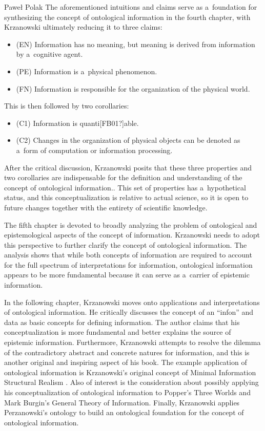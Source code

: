 \begin{newrevengenv}{Paweł Polak}
The aforementioned intuitions and claims serve as a~foundation for synthesizing the concept of ontological information in the fourth chapter, with Krzanowski ultimately reducing it to three claims:

\begin{itemize}
\item (EN) Information has no meaning, but meaning is derived from information by a~cognitive agent.
\item (PE) Information is a~physical phenomenon.
\item (FN) Information is responsible for the organization of the physical world.
\end{itemize}
This is then followed by two corollaries:

\begin{itemize}
\item (C1) Information is quanti[FB01?]able.
\item (C2) Changes in the organization of physical objects can be denoted as a~form of computation or information processing.
\end{itemize}
After the critical discussion, Krzanowski posits that these three properties and two corollaries are indispensable for the definition and understanding of the concept of ontological information.. This set of properties has a~hypothetical status, and this conceptualization is relative to actual science, so it is open to future changes together with the entirety of scientific knowledge.

The fifth chapter is devoted to broadly analyzing the problem of ontological and epistemological aspects of the concept of information. Krzanowski needs to adopt this perspective to further clarify the concept of ontological information. The analysis shows that while both concepts of information are required to account for the full spectrum of interpretations for information, ontological information appears to be more fundamental because it can serve as a~carrier of epistemic information.

In the following chapter, Krzanowski moves onto applications and interpretations of ontological information. He critically discusses the concept of an ``infon'' and data as basic concepts for defining information. The author claims that his conceptualization is more fundamental and better explains the source of epistemic information. Furthermore, Krzanowski attempts to resolve the dilemma of the contradictory abstract and concrete natures for information, and this is another original and inspiring aspect of his book. The example application of ontological information is Krzanowski's original concept of Minimal Information Structural Realism
\parencite[first introduced in][]{krzanowski_minimal_2017}. %
 Also of interest is the consideration about possibly applying his conceptualization of ontological information to Popper's Three Worlds and Mark Burgin's General Theory of Information. Finally, Krzanowski applies Perzanowski's ontology to build an ontological foundation for the concept of ontological information.


\end{newrevengenv}
